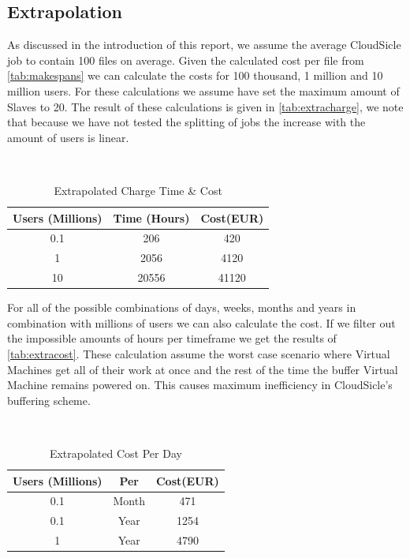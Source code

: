 \documentclass[twocolumn,twoside]{IEEEtran}
\begin{document}
\subsection{Extrapolation}
As discussed in the introduction of this report, we assume the average CloudSicle job to contain 100 files on average.
Given the calculated cost per file from \autoref{tab:makespans} we can calculate the costs for 100 thousand, 1 million and 10 million users.
For these calculations we assume have set the maximum amount of Slaves to 20.
The result of these calculations is given in \autoref{tab:extracharge}, we note that because we have
not tested the splitting of jobs the increase with the amount of users is linear.

\begin{table}[htb]
\caption{Extrapolated Charge Time \& Cost}
\label{tab:extracharge}
\begin{center}
{\tt
\begin{tabular}{|c||c|c|}
\hline
Users (Millions)&Time (Hours)&Cost(EUR)\\\hline\hline
0.1&206&420\\\hline
1&2056&4120\\\hline
10&20556&41120\\\hline
\end{tabular}
} 
\end{center}
\end{table}

For all of the possible combinations of days, weeks, months and years in combination
with millions of users we can also calculate the cost. If we filter out the impossible
amounts of hours per timeframe we get the results of \autoref{tab:extracost}.
These calculation assume the worst case scenario where Virtual Machines get
all of their work at once and the rest of the time the buffer Virtual Machine
remains powered on. This causes maximum inefficiency in CloudSicle's buffering
scheme.

\begin{table}[htb]
\caption{Extrapolated Cost Per Day}
\label{tab:extracost}
\begin{center}
{\tt
\begin{tabular}{|c|c||c|}
\hline
Users (Millions)&Per&Cost(EUR)\\\hline\hline
0.1&Month&471\\\hline
0.1&Year&1254\\\hline
1&Year&4790\\\hline
\end{tabular}
} 
\end{center}
\end{table}
\end{document}
